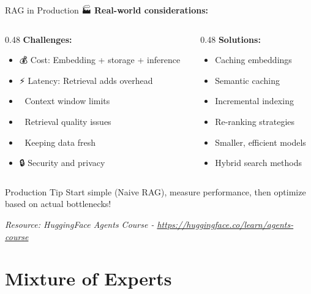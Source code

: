 \documentclass[aspectratio=169]{beamer}
\begin{document}
\begin{frame}[shrink=10]{RAG in Production 🏭}
\textbf{Real-world considerations:}

\begin{columns}[T]
\begin{column}{0.48\textwidth}
\textbf{Challenges:}
\begin{itemize}\setlength{\itemsep}{0pt}
    \item 💰 Cost: Embedding + storage + inference
    \item ⚡ Latency: Retrieval adds overhead
    \item 📏 Context window limits
    \item 🎯 Retrieval quality issues
    \item 🔄 Keeping data fresh
    \item 🔒 Security and privacy
\end{itemize}
\end{column}

\begin{column}{0.48\textwidth}
\textbf{Solutions:}
\begin{itemize}\setlength{\itemsep}{0pt}
    \item Caching embeddings
    \item Semantic caching
    \item Incremental indexing
    \item Re-ranking strategies
    \item Smaller, efficient models
    \item Hybrid search methods
\end{itemize}
\end{column}
\end{columns}

\vspace{1em}

\begin{alertblock}{Production Tip}
Start simple (Naive RAG), measure performance, then optimize based on actual bottlenecks!
\end{alertblock}

\small
\textit{Resource: HuggingFace Agents Course - \url{https://huggingface.co/learn/agents-course}}
\end{frame}

\section{Mixture of Experts}
\end{document}
